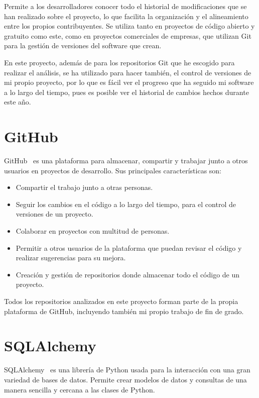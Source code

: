 \documentclass[a4paper, 12pt]{book}
\begin{document}
Permite a los desarrolladores conocer todo el historial de modificaciones que se han realizado sobre el proyecto, lo que facilita la organización y el alineamiento entre los propios contribuyentes. Se utiliza tanto en proyectos de código abierto y gratuito como este, como en proyectos comerciales de empresas, que utilizan Git para la gestión de versiones del software que crean.


En este proyecto, además de para los repositorios Git que he escogido para realizar el análisis, se ha utilizado para hacer también, el control de versiones de mi propio proyecto, por lo que es fácil ver el progreso que ha seguido mi software a lo largo del tiempo, pues es posible ver el historial de cambios hechos durante este año.

\section{GitHub}
\label{sec:GitHub}

GitHub~\cite{github:_github}  es una plataforma para almacenar, compartir y trabajar junto a otros usuarios en proyectos de desarrollo. Sus principales características son:

\begin{itemize}
  \item Compartir el trabajo junto a otras personas.
  \item Seguir los cambios en el código a lo largo del tiempo, para el control de versiones de un proyecto.
  \item Colaborar en proyectos con multitud de personas.
  \item Permitir a otros usuarios de la plataforma que puedan revisar el código y realizar sugerencias para su mejora.
  \item Creación y gestión de repositorios donde almacenar todo el código de un proyecto.
\end{itemize}

Todos los repositorios analizados en este proyecto forman parte de la propia plataforma de GitHub, incluyendo también mi propio trabajo de fin de grado.

\section{SQLAlchemy}
\label{sec:SQLAlchemy}

SQLAlchemy~\cite{myerscopeland:_essentialsqlalchemy} es una librería de Python usada para la interacción con una gran variedad de bases de datos. Permite crear modelos de datos y consultas de una manera sencilla y cercana a las clases de Python.
\end{document}
